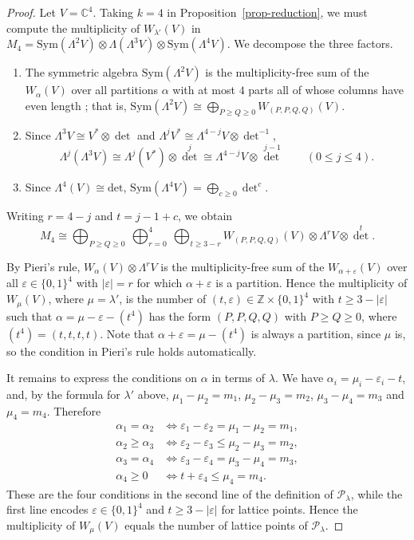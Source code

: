 \documentclass[reqno]{amsart}
\theoremstyle{plain}
\theoremstyle{definition}
\theoremstyle{remark}
\theoremstyle{plain}
\newcommand{\C}{\mathbb{C}}
\newcommand{\Z}{\mathbb{Z}}
\begin{document}
\begin{proof}
Let $V=\C^4$. Taking $k=4$ in Proposition~\ref{prop-reduction}, we must
compute the multiplicity of $W_{\lambda'}(V)$ in
$M_4=\mathrm{Sym}(\Lambda^2V)\otimes\Lambda(\Lambda^3V)\otimes\mathrm{Sym}(\Lambda^4V)$.
We decompose the three factors.
\begin{enumerate}\setlength{\itemsep}{6pt}
\item The symmetric algebra $\mathrm{Sym}(\Lambda^2V)$ is the multiplicity-free
sum of the $W_\alpha(V)$ over all partitions $\alpha$ with at most $4$ parts all
of whose columns have even length \cite[Ch.~I]{macdonald}; that is,
$\mathrm{Sym}(\Lambda^2V)\cong\bigoplus_{P\ge Q\ge0}W_{(P,P,Q,Q)}(V)$.
\item Since $\Lambda^3V\cong V^*\otimes\det$ and
$\Lambda^jV^*\cong\Lambda^{4-j}V\otimes{\det}^{-1}$,
$$\Lambda^j(\Lambda^3V)\cong\Lambda^j(V^*)\otimes{\det}^j\cong\Lambda^{4-j}V\otimes{\det}^{\,j-1}\qquad(0\le j\le4).$$
\item Since $\Lambda^4(V)\cong\mathrm{det}$, $\mathrm{Sym}(\Lambda^4V)=\bigoplus_{c\ge0}{\det}^c$.
\end{enumerate}

\smallskip
Writing $r=4-j$ and $t=j-1+c$, we obtain
$$M_4\cong\bigoplus_{P\ge Q\ge0}\ \bigoplus_{r=0}^{4}\ \bigoplus_{t\ge3-r}W_{(P,P,Q,Q)}(V)\otimes\Lambda^rV\otimes{\det}^t.$$

\smallskip
By Pieri's rule, $W_\alpha(V)\otimes\Lambda^rV$ is the multiplicity-free sum of
the $W_{\alpha+\varepsilon}(V)$ over all $\varepsilon\in\{0,1\}^4$ with
$|\varepsilon|=r$ for which $\alpha+\varepsilon$ is a partition. Hence the
multiplicity of $W_\mu(V)$, where $\mu=\lambda'$, is the number of
$(t,\varepsilon)\in\Z\times\{0,1\}^4$ with $t\ge3-|\varepsilon|$ such that
$\alpha=\mu-\varepsilon-(t^4)$ has the form $(P,P,Q,Q)$ with $P\ge Q\ge0$,
where $(t^4)=(t,t,t,t)$. Note that $\alpha+\varepsilon=\mu-(t^4)$ is always a
partition, since $\mu$ is, so the condition in Pieri's rule holds
automatically.

\smallskip
It remains to express the conditions on $\alpha$ in terms of $\lambda$. We have
$\alpha_i=\mu_i-\varepsilon_i-t$, and, by the formula for $\lambda'$ above,
$\mu_1-\mu_2=m_1$, $\mu_2-\mu_3=m_2$, $\mu_3-\mu_4=m_3$ and $\mu_4=m_4$.
Therefore
\begin{align*}
\alpha_1=\alpha_2 &\iff \varepsilon_1-\varepsilon_2=\mu_1-\mu_2=m_1,\\
\alpha_2\ge\alpha_3 &\iff \varepsilon_2-\varepsilon_3\le\mu_2-\mu_3=m_2,\\
\alpha_3=\alpha_4 &\iff \varepsilon_3-\varepsilon_4=\mu_3-\mu_4=m_3,\\
\alpha_4\ge0 &\iff t+\varepsilon_4\le\mu_4=m_4.
\end{align*}
These are the four conditions in the second line of the definition of
$\mathcal P_\lambda$, while the first line encodes
$\varepsilon\in\{0,1\}^4$ and $t\ge3-|\varepsilon|$ for lattice points. Hence
the multiplicity of $W_\mu(V)$ equals the number of lattice points of
$\mathcal P_\lambda$.


\end{proof}
\end{document}
